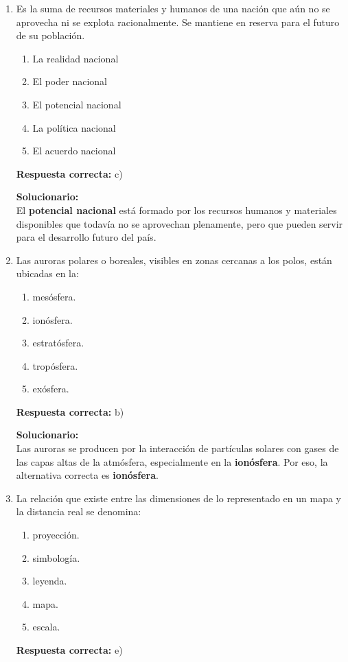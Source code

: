 \begin{enumerate}
	
	\item Es la suma de recursos materiales y humanos de una nación que aún no se aprovecha ni se explota racionalmente. Se mantiene en reserva para el futuro de su población.
	\begin{enumerate}[label=\alph*)]
		\item La realidad nacional
		\item El poder nacional
		\item El potencial nacional
		\item La política nacional
		\item El acuerdo nacional
	\end{enumerate}
	\textbf{Respuesta correcta:} c)
	
	\vspace{2mm}
	\textbf{Solucionario:}\\
	El \textbf{potencial nacional} está formado por los recursos humanos y materiales disponibles que todavía no se aprovechan plenamente, pero que pueden servir para el desarrollo futuro del país.
	
	\vspace{6mm}
	
	\item Las auroras polares o boreales, visibles en zonas cercanas a los polos, están ubicadas en la:
	\begin{enumerate}[label=\alph*)]
		\item mesósfera.
		\item ionósfera.
		\item estratósfera.
		\item tropósfera.
		\item exósfera.
	\end{enumerate}
	\textbf{Respuesta correcta:} b)
	
	\vspace{2mm}
	\textbf{Solucionario:}\\
	Las auroras se producen por la interacción de partículas solares con gases de las capas altas de la atmósfera, especialmente en la \textbf{ionósfera}. Por eso, la alternativa correcta es \textbf{ionósfera}.
	
	\vspace{6mm}
	
	\item La relación que existe entre las dimensiones de lo representado en un mapa y la distancia real se denomina:
	\begin{enumerate}[label=\alph*)]
		\item proyección.
		\item simbología.
		\item leyenda.
		\item mapa.
		\item escala.
	\end{enumerate}
	\textbf{Respuesta correcta:} e)
	

\end{enumerate}
